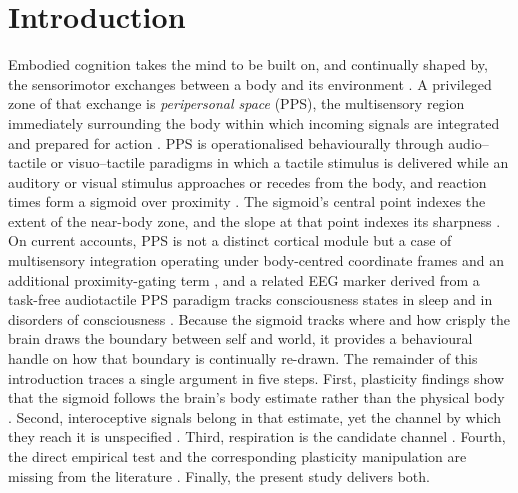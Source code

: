 \section{Introduction}

Embodied cognition takes the mind to be built on, and continually shaped by, the sensorimotor exchanges between a body and its environment \citep{Glenberg2010, Barsalou2008, barsalou2008grounded}. A privileged zone of that exchange is \emph{peripersonal space} (PPS), the multisensory region immediately surrounding the body within which incoming signals are integrated and prepared for action \citep{rizzolatti1997space, diPellegrino2015, Serino2019, noel_2021}. PPS is operationalised behaviourally through audio--tactile or visuo--tactile paradigms in which a tactile stimulus is delivered while an auditory or visual stimulus approaches or recedes from the body, and reaction times form a sigmoid over proximity \citep{Canzoneri2012, teneggi2013social}. The sigmoid's central point indexes the extent of the near-body zone, and the slope at that point indexes its sharpness \citep{Bufacchi2018, Basile2024, Serino2019}. On current accounts, PPS is not a distinct cortical module but a case of multisensory integration operating under body-centred coordinate frames and an additional proximity-gating term \citep{noel_2018, bertoni_2025, straka_2022}, and a related EEG marker derived from a task-free audiotactile PPS paradigm tracks consciousness states in sleep and in disorders of consciousness \citep{bertoni_2026}. Because the sigmoid tracks where and how crisply the brain draws the boundary between self and world, it provides a behavioural handle on how that boundary is continually re-drawn. The remainder of this introduction traces a single argument in five steps. First, plasticity findings show that the sigmoid follows the brain's body estimate rather than the physical body \citep{noel_2021, Serino2019}. Second, interoceptive signals belong in that estimate, yet the channel by which they reach it is unspecified \citep{Ardizzi2018, salvato_2020, bogdanova_2021}. Third, respiration is the candidate channel \citep{saltafossi_2025, allen_2021}. Fourth, the direct empirical test and the corresponding plasticity manipulation are missing from the literature \citep{spaccasassi_2019, karakoc_2025}. Finally, the present study delivers both.


